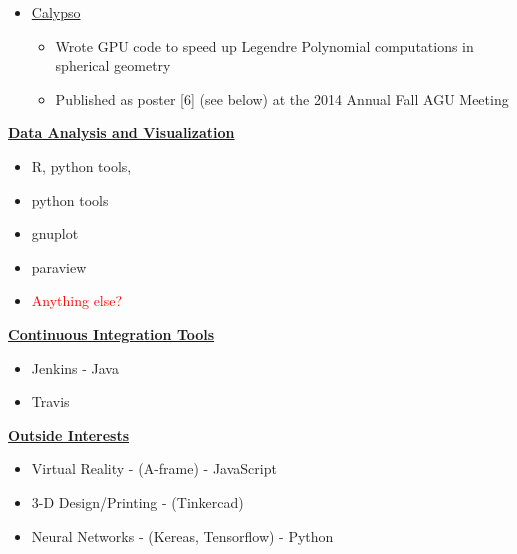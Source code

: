\documentclass[11pt]{ltxdoc}
\begin{document}
\begin{description}
\begin{description}
\begin{itemize}
\begin{itemize}
           \end{itemize}

        \item       \href{https://geodynamics.org/cig/software/calypso/}{Calypso}         

          \begin{itemize}
          	
          	\item Wrote GPU code to speed up Legendre Polynomial computations in spherical geometry
          	
          	\item Published as poster [6] (see below) at the 2014 Annual Fall AGU Meeting
          	
          \end{itemize}
           

      \end{itemize}

    
    \end{description}
    
    \item[] \textbf{\underline{Data Analysis and Visualization}}
    
      \begin{itemize}
      	    	
        \item R, python tools,
       
        \item python tools
        
        \item  gnuplot
        
        \item paraview 
        
        \item \textcolor{red}{Anything else?}
        
        
      \end{itemize}
    \item[] \textbf{\underline{Continuous Integration Tools}}
  
    \begin{itemize}
      \item Jenkins - Java
      \item Travis
    \end{itemize}
    
    \item[] \textbf{\underline{Outside Interests}}
    
      \begin{itemize}
        \item Virtual Reality - (A-frame) - JavaScript
        \item  3-D Design/Printing - (Tinkercad)
      
        \item  Neural Networks - (Kereas, Tensorflow) - Python
      
      \end{itemize}

  \end{description}
\end{document}
